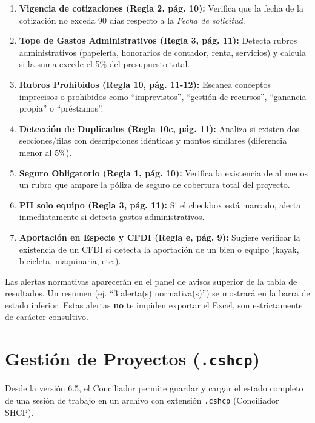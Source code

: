 \documentclass[12pt, a4paper, oneside]{report}
\begin{document}
\begin{enumerate}
    \item \textbf{Vigencia de cotizaciones (Regla 2, pág. 10):} Verifica que la fecha de la cotización no exceda 90 días respecto a la \textit{Fecha de solicitud}.
    \item \textbf{Tope de Gastos Administrativos (Regla 3, pág. 11):} Detecta rubros administrativos (papelería, honorarios de contador, renta, servicios) y calcula si la suma excede el 5\% del presupuesto total.
    \item \textbf{Rubros Prohibidos (Regla 10, pág. 11-12):} Escanea conceptos imprecisos o prohibidos como ``imprevistos'', ``gestión de recursos'', ``ganancia propia'' o ``préstamos''.
    \item \textbf{Detección de Duplicados (Regla 10c, pág. 11):} Analiza si existen dos secciones/filas con descripciones idénticas y montos similares (diferencia menor al 5\%).
    \item \textbf{Seguro Obligatorio (Regla 1, pág. 10):} Verifica la existencia de al menos un rubro que ampare la póliza de seguro de cobertura total del proyecto.
    \item \textbf{PII solo equipo (Regla 3, pág. 11):} Si el checkbox está marcado, alerta inmediatamente si detecta gastos administrativos.
    \item \textbf{Aportación en Especie y CFDI (Regla e, pág. 9):} Sugiere verificar la existencia de un CFDI si detecta la aportación de un bien o equipo (kayak, bicicleta, maquinaria, etc.).
\end{enumerate}

\begin{warningbox}
Las alertas normativas aparecerán en el panel de avisos superior de la tabla de resultados. Un resumen (ej. ``3 alerta(s) normativa(s)'') se mostrará en la barra de estado inferior. Estas alertas \textbf{no} te impiden exportar el Excel, son estrictamente de carácter consultivo.
\end{warningbox}

\chapter{Gestión de Proyectos (\texttt{.cshcp})}
\label{ch:proyectos}

Desde la versión 6.5, el Conciliador permite guardar y cargar el estado
completo de una sesión de trabajo en un archivo con extensión \texttt{.cshcp}
(Conciliador SHCP).
\end{document}
